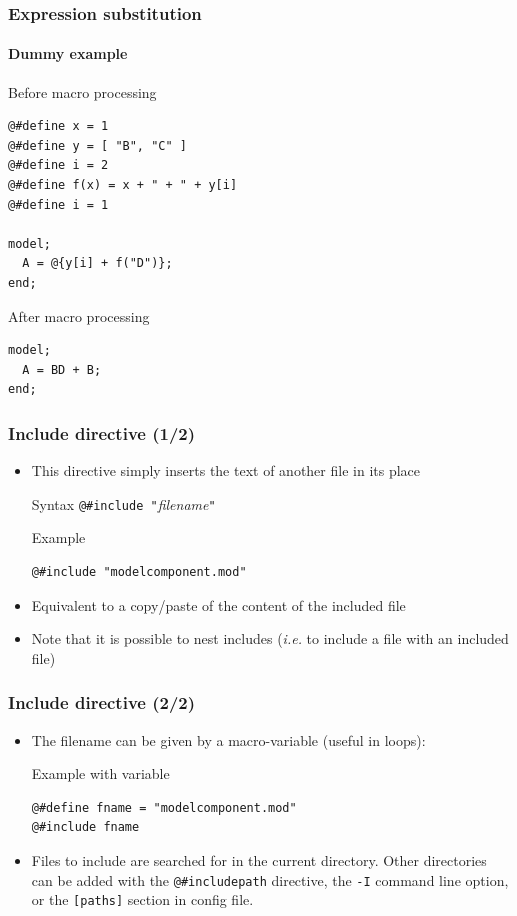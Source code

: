 \documentclass{beamer}
\begin{document}
\begin{frame}[fragile=singleslide]
  \frametitle{Expression substitution}
  \framesubtitle{Dummy example}
  \begin{block}{Before macro processing}
\begin{verbatim}
@#define x = 1
@#define y = [ "B", "C" ]
@#define i = 2
@#define f(x) = x + " + " + y[i]
@#define i = 1

model;
  A = @{y[i] + f("D")};
end;
\end{verbatim}
  \end{block}
  \begin{block}{After macro processing}
\begin{verbatim}
model;
  A = BD + B;
end;
\end{verbatim}
  \end{block}
\end{frame}

\begin{frame}[fragile=singleslide]
  \frametitle{Include directive (1/2)}
  \begin{itemize}
  \item This directive simply inserts the text of another file in its place
    \begin{block}{Syntax}
      \verb+@#include "+\textit{filename}\verb+"+
    \end{block}
    \begin{block}{Example}
\begin{verbatim}
@#include "modelcomponent.mod"
\end{verbatim}
    \end{block}
  \item Equivalent to a copy/paste of the content of the included file
  \item Note that it is possible to nest includes (\textit{i.e.} to include a
    file with an included file)
  \end{itemize}
\end{frame}

\begin{frame}[fragile=singleslide]
  \frametitle{Include directive (2/2)}
  \begin{itemize}
\item The filename can be given by a macro-variable (useful in loops):
    \begin{block}{Example with variable}
\begin{verbatim}
@#define fname = "modelcomponent.mod"
@#include fname
\end{verbatim}
    \end{block}
  \item Files to include are searched for in the current directory. Other directories can
    be added with the
    \verb+@#includepath+ directive, the \texttt{-I} command line option, or the
    \texttt{[paths]} section in config file.
  \end{itemize}
\end{frame}
\end{document}
